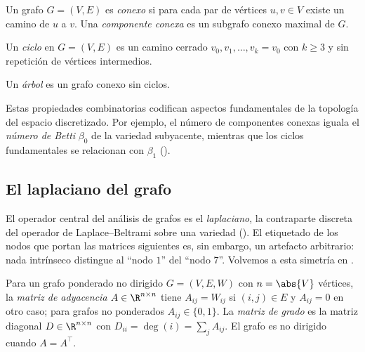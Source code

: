 \begin{definition}
\label{def:graphs:connected}
Un grafo $G = (V, E)$ es \emph{conexo} si para cada par de v\'ertices
$u, v \in V$ existe un camino de $u$ a $v$. Una \emph{componente conexa} es un
subgrafo conexo maximal de $G$.
\end{definition}

\begin{definition}[Ciclo]
\label{def:graphs:cycle}
Un \emph{ciclo} en $G = (V, E)$ es un camino cerrado $v_0, v_1, \dots, v_k = v_0$
con $k \ge 3$ y sin repetici\'on de v\'ertices intermedios.
\end{definition}

\begin{definition}[\'Arbol]
\label{def:graphs:tree}
Un \emph{\'arbol} es un grafo conexo sin ciclos.
\end{definition}

Estas propiedades combinatorias codifican aspectos fundamentales de la topolog\'ia
del espacio discretizado. Por ejemplo, el n\'umero de componentes conexas iguala
el \emph{n\'umero de Betti} $\beta_0$ de la variedad subyacente, mientras que los
ciclos fundamentales se relacionan con $\beta_1$ ().

\subsection{El laplaciano del grafo}
\label{sec:graphs:laplacian}

El operador central del an\'alisis de grafos es el \emph{laplaciano}, la
contraparte discreta del operador de Laplace--Beltrami sobre una variedad
(). El etiquetado de los nodos que portan las matrices
siguientes es, sin embargo, un artefacto arbitrario: nada intr\'inseco distingue
al ``nodo $1$'' del ``nodo $7$''. Volvemos a esta simetr\'ia en
.

\begin{definition}
\label{def:graphs:adjacency}
Para un grafo ponderado no dirigido $G = (V, E, W)$ con $n = \abs{V}$ v\'ertices,
la \emph{matriz de adyacencia} $A \in \R^{n \times n}$ tiene $A_{ij} = W_{ij}$ si
$(i,j) \in E$ y $A_{ij} = 0$ en otro caso; para grafos no ponderados
$A_{ij} \in \{0,1\}$. La \emph{matriz de grado} es la matriz diagonal
$D \in \R^{n \times n}$ con $D_{ii} = \deg(i) = \sum_j A_{ij}$. El grafo es no
dirigido cuando $A = A^\top$.
\end{definition}

